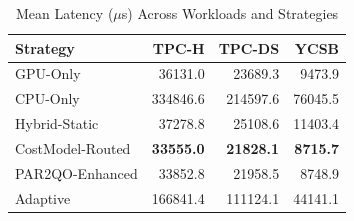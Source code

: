 \begin{table}[htbp]
\centering
\caption{Mean Latency ($\mu$s) Across Workloads and Strategies}
\label{tab:multi-workload}
\begin{tabular}{lrrr}
\toprule
Strategy & TPC-H & TPC-DS & YCSB \\
\midrule
  GPU-Only & 36131.0 & 23689.3 & 9473.9 \\
  CPU-Only & 334846.6 & 214597.6 & 76045.5 \\
  Hybrid-Static & 37278.8 & 25108.6 & 11403.4 \\
  CostModel-Routed & \textbf{33555.0} & \textbf{21828.1} & \textbf{8715.7} \\
  PAR2QO-Enhanced & 33852.8 & 21958.5 & 8748.9 \\
  Adaptive & 166841.4 & 111124.1 & 44141.1 \\
\bottomrule
\end{tabular}
\end{table}